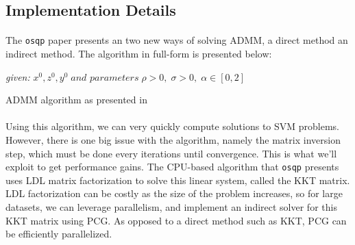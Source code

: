 \documentclass[justified,nobib]{tufte-handout}
\begin{document}
\begin{fullwidth}





 
\section{Implementation Details}
\paragraph{}
The \texttt{osqp} paper presents an two new ways of solving ADMM, a direct method an indirect method. The algorithm in full-form is presented below:
\begin{algorithm}[htp]
\SetAlgoLined
\textit{given:}
 $x^0, z^0, y^0 \; \textit{and parameters} \;\rho >0, \; \sigma >0, \; \alpha \in [0,2]$
 \\  \caption{ADMM algorithm as presented in \cite{osqp}}
\end{algorithm}
\paragraph{} Using this algorithm, we can very quickly compute solutions to SVM problems. However, there is one big issue with the algorithm, namely the matrix inversion step, which must be done every iterations until convergence. This is what we'll exploit to get performance gains. The CPU-based algorithm that \texttt{osqp} presents uses LDL matrix factorization to solve this linear system, called the KKT matrix. LDL factorization can be costly as the size of the problem increases, so for large datasets, we can leverage parallelism, and implement an indirect solver for this KKT matrix using PCG. As opposed to a direct method such as KKT, PCG can be efficiently parallelized. 


\end{fullwidth}
\end{document}
